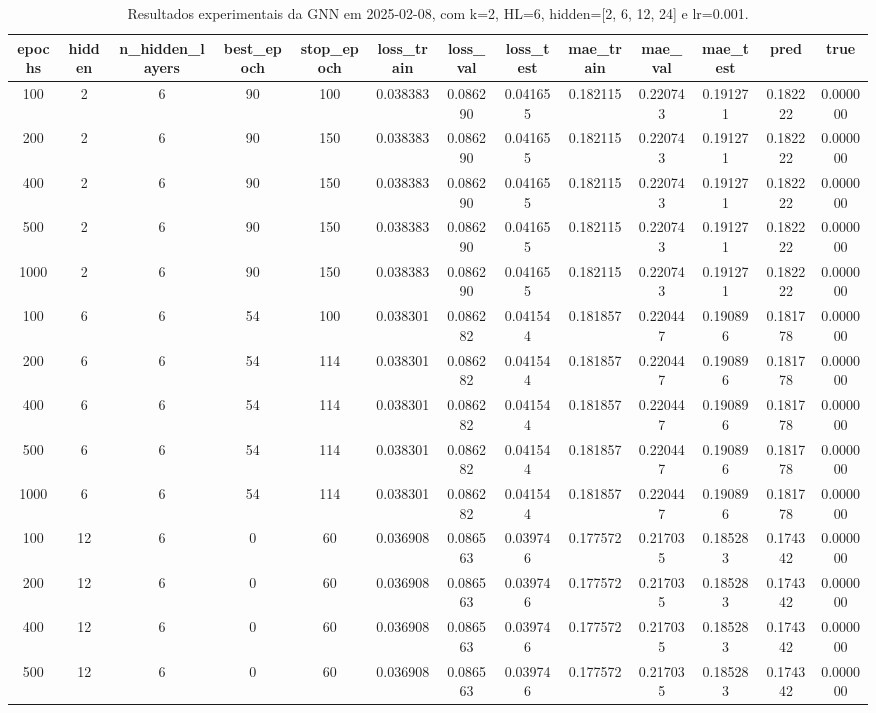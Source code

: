 \begin{table}[h]
\centering
\caption{Resultados experimentais da GNN em 2025-02-08, com k=2, HL=6, hidden=[2, 6, 12, 24] e lr=0.001.}
\label{tab:gnn_results_k2_hl6_d20250208}
\begin{tabular}{ccccccccccccc}
\toprule
epochs & hidden & n\_hidden\_layers & best\_epoch & stop\_epoch & loss\_train & loss\_val & loss\_test & mae\_train & mae\_val & mae\_test & pred & true \\
\midrule
100 & 2 & 6 & 90 & 100 & 0.038383 & 0.086290 & 0.041655 & 0.182115 & 0.220743 & 0.191271 & 0.182222 & 0.000000 \\
200 & 2 & 6 & 90 & 150 & 0.038383 & 0.086290 & 0.041655 & 0.182115 & 0.220743 & 0.191271 & 0.182222 & 0.000000 \\
400 & 2 & 6 & 90 & 150 & 0.038383 & 0.086290 & 0.041655 & 0.182115 & 0.220743 & 0.191271 & 0.182222 & 0.000000 \\
500 & 2 & 6 & 90 & 150 & 0.038383 & 0.086290 & 0.041655 & 0.182115 & 0.220743 & 0.191271 & 0.182222 & 0.000000 \\
1000 & 2 & 6 & 90 & 150 & 0.038383 & 0.086290 & 0.041655 & 0.182115 & 0.220743 & 0.191271 & 0.182222 & 0.000000 \\
100 & 6 & 6 & 54 & 100 & 0.038301 & 0.086282 & 0.041544 & 0.181857 & 0.220447 & 0.190896 & 0.181778 & 0.000000 \\
200 & 6 & 6 & 54 & 114 & 0.038301 & 0.086282 & 0.041544 & 0.181857 & 0.220447 & 0.190896 & 0.181778 & 0.000000 \\
400 & 6 & 6 & 54 & 114 & 0.038301 & 0.086282 & 0.041544 & 0.181857 & 0.220447 & 0.190896 & 0.181778 & 0.000000 \\
500 & 6 & 6 & 54 & 114 & 0.038301 & 0.086282 & 0.041544 & 0.181857 & 0.220447 & 0.190896 & 0.181778 & 0.000000 \\
1000 & 6 & 6 & 54 & 114 & 0.038301 & 0.086282 & 0.041544 & 0.181857 & 0.220447 & 0.190896 & 0.181778 & 0.000000 \\
100 & 12 & 6 & 0 & 60 & 0.036908 & 0.086563 & 0.039746 & 0.177572 & 0.217035 & 0.185283 & 0.174342 & 0.000000 \\
200 & 12 & 6 & 0 & 60 & 0.036908 & 0.086563 & 0.039746 & 0.177572 & 0.217035 & 0.185283 & 0.174342 & 0.000000 \\
400 & 12 & 6 & 0 & 60 & 0.036908 & 0.086563 & 0.039746 & 0.177572 & 0.217035 & 0.185283 & 0.174342 & 0.000000 \\
500 & 12 & 6 & 0 & 60 & 0.036908 & 0.086563 & 0.039746 & 0.177572 & 0.217035 & 0.185283 & 0.174342 & 0.000000 \\

\end{tabular}
\end{table}
